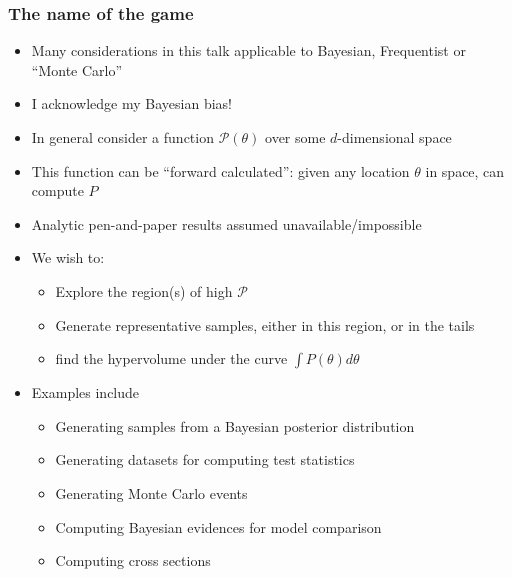 \documentclass[aspectratio=169]{beamer}
\begin{document}
\begin{frame}
    \frametitle{The name of the game}
    \begin{itemize}
        \item Many considerations in this talk applicable to Bayesian, Frequentist or ``Monte Carlo'' 
        \item I acknowledge my Bayesian bias!
        \item In general consider a function $\mathcal{P}(\theta)$ over some $d$-dimensional space
        \item This function can be ``forward calculated'': given any location $\theta$ in space, can compute $P$
        \item Analytic pen-and-paper results assumed unavailable/impossible
        \item We wish to:
            \begin{itemize}
                \item Explore the region(s) of high $\mathcal{P}$
                \item Generate representative samples, either in this region, or in the tails
                \item find the hypervolume under the curve $\int P(\theta) d\theta$
            \end{itemize}
        \item Examples include
            \begin{itemize}
                \item Generating samples from a Bayesian posterior distribution
                \item Generating datasets for computing test statistics
                \item Generating Monte Carlo events 
                \item Computing Bayesian evidences for model comparison
                \item Computing cross sections
            \end{itemize}
    \end{itemize}
\end{frame}

\end{document}
